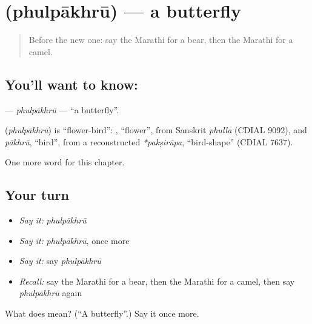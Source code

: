 \section[\texorpdfstring{\mr{फुलपाखरू} (phulpākhrū)}{फुलपाखरू (phulpākhrū)}]{ (phulpākhrū) — a butterfly}

\label{lesson:MR-C102-phulpakhru}



\begin{quote}
Before the new one: say the Marathi for a bear, then the Marathi for a camel.
\end{quote}

\subsection*{You'll want to know: }
\textbf{} — \emph{phulpākhrū} — \textquotedblleft{}a butterfly\textquotedblright{}.

\begin{cousinweb}
\textbf{} (\emph{phulpākhrū}) is \textquotedblleft{}flower-bird\textquotedblright{}: \textbf{}, \textquotedblleft{}flower\textquotedblright{}, from Sanskrit \emph{phulla} (CDIAL 9092), and \emph{pākhrū}, \textquotedblleft{}bird\textquotedblright{}, from a reconstructed \emph{*pakṣirūpa}, \textquotedblleft{}bird-shape\textquotedblright{} (CDIAL 7637).
\end{cousinweb}

\begin{grammarlens}[title={What you've built}]
One more word for this chapter.
\end{grammarlens}

\subsection*{Your turn}
\begin{itemize}
\raggedright
  \item \emph{Say it:} \emph{phulpākhrū}
  \item \emph{Say it:} \emph{phulpākhrū}, once more
  \item \emph{Say it:} say \emph{phulpākhrū}
  \item \emph{Recall:} say the Marathi for a bear, then the Marathi for a camel, then say \emph{phulpākhrū} again
\end{itemize}

\begin{tcolorbox}[breakable,colback=teal!4,colframe=teal!35!black,title={Before you move on}]
What does  mean? (\textquotedblleft{}A butterfly\textquotedblright{}.) Say it once more.
\end{tcolorbox}
